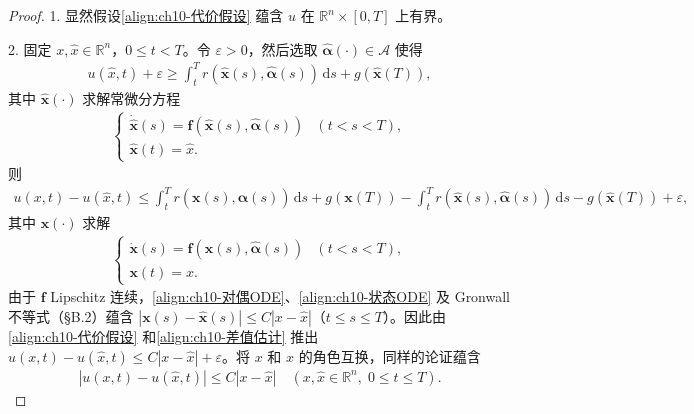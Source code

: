 \documentclass[../../main.tex]{subfiles}
\begin{document}
\begin{proof}
1. 显然假设\eqref{align:ch10-代价假设} 蕴含 $u$ 在 $\mathbb{R}^n\times[0,T]$ 上有界。

2. 固定 $x,\widehat{x}\in\mathbb{R}^n$，$0\leqslant t<T$。令 $\varepsilon>0$，然后选取 $\widehat{\boldsymbol{\alpha}}(\cdot)\in\mathcal{A}$ 使得
\begin{align}
u(\widehat{x},t)+\varepsilon\geqslant \int_t^T r(\widehat{\mathbf{x}}(s),\widehat{\boldsymbol{\alpha}}(s))\,\mathrm{d}s+g(\widehat{\mathbf{x}}(T)),
\label{align:ch10-对偶控制}
\end{align}
其中 $\widehat{\mathbf{x}}(\cdot)$ 求解常微分方程
\begin{align}
\begin{cases}
\dot{\widehat{\mathbf{x}}}(s)=\mathbf{f}(\widehat{\mathbf{x}}(s),\widehat{\boldsymbol{\alpha}}(s)) & (t<s<T),\\
\widehat{\mathbf{x}}(t)=\widehat{x}.
\end{cases}
\label{align:ch10-对偶ODE}
\end{align}
则
\begin{align}
u(x,t)-u(\widehat{x},t)\leqslant \int_t^T r(\mathbf{x}(s),\widehat{\boldsymbol{\alpha}}(s))\,\mathrm{d}s+g(\mathbf{x}(T))-\int_t^T r(\widehat{\mathbf{x}}(s),\widehat{\boldsymbol{\alpha}}(s))\,\mathrm{d}s-g(\widehat{\mathbf{x}}(T))+\varepsilon,
\label{align:ch10-差值估计}
\end{align}
其中 $\mathbf{x}(\cdot)$ 求解
\begin{align}
\begin{cases}
\dot{\mathbf{x}}(s)=\mathbf{f}(\mathbf{x}(s),\widehat{\boldsymbol{\alpha}}(s)) & (t<s<T),\\
\mathbf{x}(t)=x.
\end{cases}
\label{align:ch10-状态ODE}
\end{align}
由于 $\mathbf{f}$ Lipschitz 连续，\eqref{align:ch10-对偶ODE}、\eqref{align:ch10-状态ODE} 及 Gronwall 不等式（\S B.2）蕴含 $|\mathbf{x}(s)-\widehat{\mathbf{x}}(s)|\leqslant C|x-\widehat{x}|$（$t\leqslant s\leqslant T$）。因此由\eqref{align:ch10-代价假设} 和\eqref{align:ch10-差值估计} 推出 $u(x,t)-u(\widehat{x},t)\leqslant C|x-\widehat{x}|+\varepsilon$。将 $x$ 和 $\widehat{x}$ 的角色互换，同样的论证蕴含
\begin{align*}
|u(x,t)-u(\widehat{x},t)|\leqslant C|x-\widehat{x}| \quad (x,\widehat{x}\in\mathbb{R}^n,\;0\leqslant t\leqslant T).
\end{align*}


\end{proof}
\end{document}
